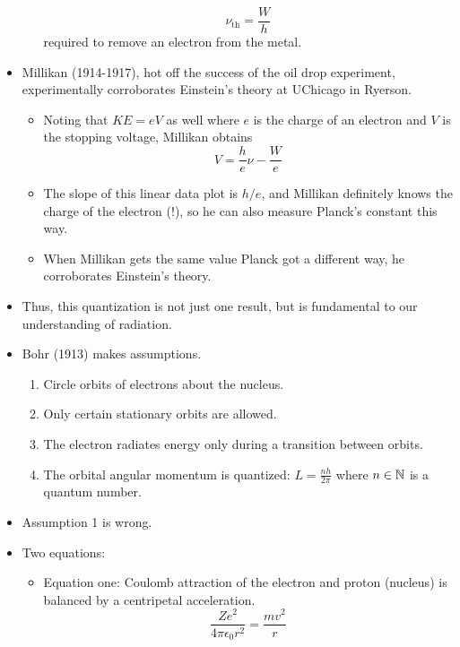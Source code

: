 \documentclass[../notes.tex]{subfiles}
\begin{document}
\begin{itemize}
\begin{itemize}
        \begin{equation*}
            \nu_\text{th} = \frac{W}{h}
        \end{equation*}
        required to remove an electron from the metal.
    \end{itemize}
    \item Millikan (1914-1917), hot off the success of the oil drop experiment, experimentally corroborates Einstein's theory at UChicago in Ryerson.
    \begin{itemize}
        \item Noting that $KE=eV$ as well where $e$ is the charge of an electron and $V$ is the stopping voltage, Millikan obtains
        \begin{equation*}
            V = \frac{h}{e}\nu-\frac{W}{e}
        \end{equation*}
        \item The slope of this linear data plot is $h/e$, and Millikan definitely knows the charge of the electron (!), so he can also measure Planck's constant this way.
        \item When Millikan gets the same value Planck got a different way, he corroborates Einstein's theory.
    \end{itemize}
    \item Thus, this quantization is not just one result, but is fundamental to our understanding of radiation.
    \item Bohr (1913) makes assumptions.
    \begin{enumerate}
        \item Circle orbits of electrons about the nucleus.
        \item Only certain stationary orbits are allowed.
        \item The electron radiates energy only during a transition between orbits.
        \item The orbital angular momentum is quantized: $L=\frac{nh}{2\pi}$ where $n\in\mathbb{N}$ is a quantum number.
    \end{enumerate}
    \item Assumption 1 is wrong.
    \item Two equations:
    \begin{itemize}
        \item Equation one: Coulomb attraction of the electron and proton (nucleus) is balanced by a centripetal acceleration.
        \begin{equation*}
            \frac{Ze^2}{4\pi\epsilon_0r^2} = \frac{mv^2}{r}

\end{equation*}
\end{itemize}
\end{itemize}
\end{document}
